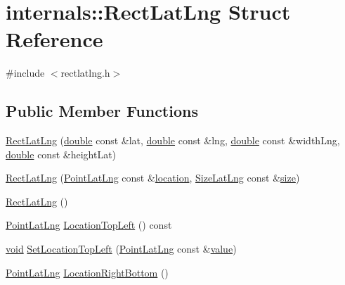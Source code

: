 \hypertarget{structinternals_1_1_rect_lat_lng}{\section{internals\-:\-:Rect\-Lat\-Lng Struct Reference}
\label{structinternals_1_1_rect_lat_lng}
}


{\ttfamily \#include $<$rectlatlng.\-h$>$}

\subsection*{Public Member Functions}
\begin{DoxyCompactItemize}
\item 
\hyperlink{group___o_p_map_widget_ga4ae20976d028402ff59ecd45b52214be}{Rect\-Lat\-Lng} (\hyperlink{_super_l_u_support_8h_a8956b2b9f49bf918deed98379d159ca7}{double} const \&lat, \hyperlink{_super_l_u_support_8h_a8956b2b9f49bf918deed98379d159ca7}{double} const \&lng, \hyperlink{_super_l_u_support_8h_a8956b2b9f49bf918deed98379d159ca7}{double} const \&width\-Lng, \hyperlink{_super_l_u_support_8h_a8956b2b9f49bf918deed98379d159ca7}{double} const \&height\-Lat)
\item 
\hyperlink{group___o_p_map_widget_gab62bfb97bab6213f9a6159d2f1c75d5d}{Rect\-Lat\-Lng} (\hyperlink{structinternals_1_1_point_lat_lng}{Point\-Lat\-Lng} const \&\hyperlink{glext_8h_a6f0165ed903f22b8bb600c3e0b628e73}{location}, \hyperlink{structinternals_1_1_size_lat_lng}{Size\-Lat\-Lng} const \&\hyperlink{glext_8h_a014d89bd76f74ef3a29c8f04b473eb76}{size})
\item 
\hyperlink{group___o_p_map_widget_ga512c376dfebb298e064a143c262ac18f}{Rect\-Lat\-Lng} ()
\item 
\hyperlink{structinternals_1_1_point_lat_lng}{Point\-Lat\-Lng} \hyperlink{group___o_p_map_widget_gaed234223ec4033a1e269d271d032c9fa}{Location\-Top\-Left} () const 
\item 
\hyperlink{group___u_a_v_objects_plugin_ga444cf2ff3f0ecbe028adce838d373f5c}{void} \hyperlink{group___o_p_map_widget_gabe9e8daac2f01196b738c5590fe23b94}{Set\-Location\-Top\-Left} (\hyperlink{structinternals_1_1_point_lat_lng}{Point\-Lat\-Lng} const \&\hyperlink{glext_8h_aa0e2e9cea7f208d28acda0480144beb0}{value})
\item 
\hyperlink{structinternals_1_1_point_lat_lng}{Point\-Lat\-Lng} \hyperlink{group___o_p_map_widget_gaa5faf64c8706dfbe274d2265f0d017ae}{Location\-Right\-Bottom} ()
\item 

\end{DoxyCompactItemize}
